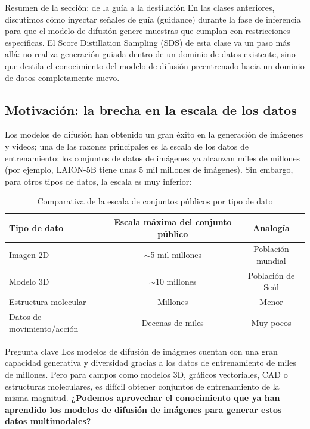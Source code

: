 \documentclass[a4paper]{article}
\begin{document}
\begin{knowledgebox}{Resumen de la sección: de la guía a la destilación}
En las clases anteriores, discutimos cómo inyectar señales de guía (guidance) durante la fase de inferencia para que el modelo de difusión genere muestras que cumplan con restricciones específicas. El Score Distillation Sampling (SDS) de esta clase va un paso más allá: no realiza generación guiada dentro de un dominio de datos existente, sino que destila el conocimiento del modelo de difusión preentrenado hacia un dominio de datos completamente nuevo.
\end{knowledgebox}

\subsection{Motivación: la brecha en la escala de los datos}

Los modelos de difusión han obtenido un gran éxito en la generación de imágenes y videos; una de las razones principales es la escala de los datos de entrenamiento: los conjuntos de datos de imágenes ya alcanzan miles de millones (por ejemplo, LAION-5B tiene unas 5 mil millones de imágenes). Sin embargo, para otros tipos de datos, la escala es muy inferior:

\begin{table}[H]
\centering
\begin{tabular}{lcc}
\toprule
\textbf{Tipo de dato} & \textbf{Escala máxima del conjunto público} & \textbf{Analogía} \\
\midrule
Imagen 2D & $\sim$5 mil millones & Población mundial \\
Modelo 3D & $\sim$10 millones & Población de Seúl \\
Estructura molecular & Millones & Menor \\
Datos de movimiento/acción & Decenas de miles & Muy pocos \\
\bottomrule
\end{tabular}
\caption{Comparativa de la escala de conjuntos públicos por tipo de dato}
\end{table}

\begin{importantbox}{Pregunta clave}
Los modelos de difusión de imágenes cuentan con una gran capacidad generativa y diversidad gracias a los datos de entrenamiento de miles de millones. Pero para campos como modelos 3D, gráficos vectoriales, CAD o estructuras moleculares, es difícil obtener conjuntos de entrenamiento de la misma magnitud. \textbf{¿Podemos aprovechar el conocimiento que ya han aprendido los modelos de difusión de imágenes para generar estos datos multimodales?}
\end{importantbox}
\end{document}
